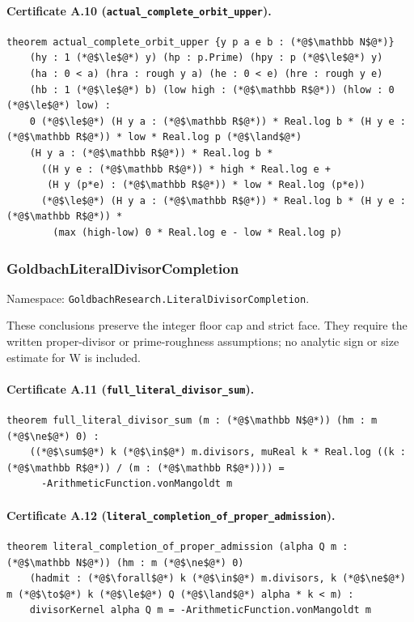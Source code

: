 \documentclass[11pt,a4paper]{article}
\theoremstyle{definition}
\theoremstyle{remark}
\begin{document}
\paragraph{Certificate A.10 (\texttt{actual\_complete\_orbit\_upper}).}
\begin{lstlisting}
theorem actual_complete_orbit_upper {y p a e b : (*@$\mathbb N$@*)}
    (hy : 1 (*@$\le$@*) y) (hp : p.Prime) (hpy : p (*@$\le$@*) y)
    (ha : 0 < a) (hra : rough y a) (he : 0 < e) (hre : rough y e)
    (hb : 1 (*@$\le$@*) b) (low high : (*@$\mathbb R$@*)) (hlow : 0 (*@$\le$@*) low) :
    0 (*@$\le$@*) (H y a : (*@$\mathbb R$@*)) * Real.log b * (H y e : (*@$\mathbb R$@*)) * low * Real.log p (*@$\land$@*)
    (H y a : (*@$\mathbb R$@*)) * Real.log b *
      ((H y e : (*@$\mathbb R$@*)) * high * Real.log e +
       (H y (p*e) : (*@$\mathbb R$@*)) * low * Real.log (p*e))
      (*@$\le$@*) (H y a : (*@$\mathbb R$@*)) * Real.log b * (H y e : (*@$\mathbb R$@*)) *
        (max (high-low) 0 * Real.log e - low * Real.log p)
\end{lstlisting}

\subsubsection{GoldbachLiteralDivisorCompletion}
Namespace: \nolinkurl{GoldbachResearch.LiteralDivisorCompletion}.

These conclusions preserve the integer floor cap and strict face. They require the written proper-divisor or prime-roughness assumptions; no analytic sign or size estimate for W is included.

\paragraph{Certificate A.11 (\texttt{full\_literal\_divisor\_sum}).}
\begin{lstlisting}
theorem full_literal_divisor_sum (m : (*@$\mathbb N$@*)) (hm : m (*@$\ne$@*) 0) :
    ((*@$\sum$@*) k (*@$\in$@*) m.divisors, muReal k * Real.log ((k : (*@$\mathbb R$@*)) / (m : (*@$\mathbb R$@*)))) =
      -ArithmeticFunction.vonMangoldt m
\end{lstlisting}

\paragraph{Certificate A.12 (\texttt{literal\_completion\_of\_proper\_admission}).}
\begin{lstlisting}
theorem literal_completion_of_proper_admission (alpha Q m : (*@$\mathbb N$@*)) (hm : m (*@$\ne$@*) 0)
    (hadmit : (*@$\forall$@*) k (*@$\in$@*) m.divisors, k (*@$\ne$@*) m (*@$\to$@*) k (*@$\le$@*) Q (*@$\land$@*) alpha * k < m) :
    divisorKernel alpha Q m = -ArithmeticFunction.vonMangoldt m
\end{lstlisting}
\end{document}
